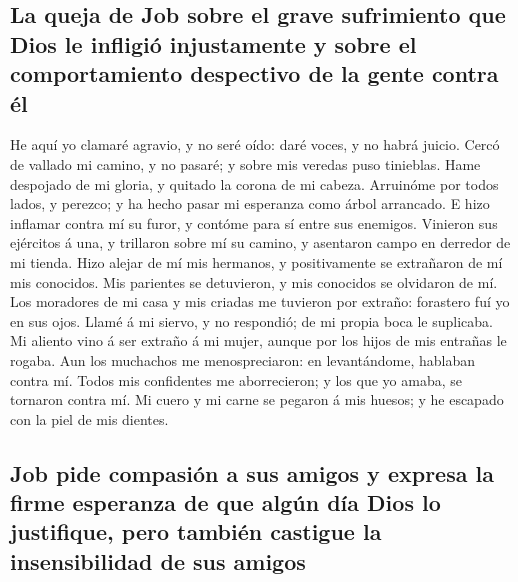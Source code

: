\hypertarget{la-queja-de-job-sobre-el-grave-sufrimiento-que-dios-le-infligiuxf3-injustamente-y-sobre-el-comportamiento-despectivo-de-la-gente-contra-uxe9l}{%
\subsection{La queja de Job sobre el grave sufrimiento que Dios le
infligió injustamente y sobre el comportamiento despectivo de la gente
contra
él}\label{la-queja-de-job-sobre-el-grave-sufrimiento-que-dios-le-infligiuxf3-injustamente-y-sobre-el-comportamiento-despectivo-de-la-gente-contra-uxe9l}}

 He aquí yo clamaré agravio, y no seré oído: daré voces, y
no habrá juicio.  Cercó de vallado mi camino, y no pasaré;
y sobre mis veredas puso tinieblas.  Hame despojado de mi
gloria, y quitado la corona de mi cabeza.  Arruinóme por
todos lados, y perezco; y ha hecho pasar mi esperanza como árbol
arrancado.  E hizo inflamar contra mí su furor, y contóme
para sí entre sus enemigos.  Vinieron sus ejércitos á
una, y trillaron sobre mí su camino, y asentaron campo en derredor de mi
tienda.  Hizo alejar de mí mis hermanos, y positivamente
se extrañaron de mí mis conocidos.  Mis parientes se
detuvieron, y mis conocidos se olvidaron de mí.  Los
moradores de mi casa y mis criadas me tuvieron por extraño: forastero
fuí yo en sus ojos.  Llamé á mi siervo, y no respondió;
de mi propia boca le suplicaba.  Mi aliento vino á ser
extraño á mi mujer, aunque por los hijos de mis entrañas le rogaba.
 Aun los muchachos me menospreciaron: en levantándome,
hablaban contra mí.  Todos mis confidentes me
aborrecieron; y los que yo amaba, se tornaron contra mí. 
Mi cuero y mi carne se pegaron á mis huesos; y he escapado con la piel
de mis dientes.

\hypertarget{job-pide-compasiuxf3n-a-sus-amigos-y-expresa-la-firme-esperanza-de-que-alguxfan-duxeda-dios-lo-justifique-pero-tambiuxe9n-castigue-la-insensibilidad-de-sus-amigos}{%
\subsection{Job pide compasión a sus amigos y expresa la firme esperanza
de que algún día Dios lo justifique, pero también castigue la
insensibilidad de sus
amigos}\label{job-pide-compasiuxf3n-a-sus-amigos-y-expresa-la-firme-esperanza-de-que-alguxfan-duxeda-dios-lo-justifique-pero-tambiuxe9n-castigue-la-insensibilidad-de-sus-amigos}}

